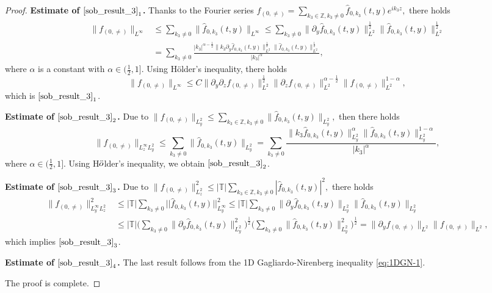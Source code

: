 \documentclass[12pt, reqno]{amsart}
\numberwithin{equation}{section}
\begin{document}
	\begin{proof}
		
		{\bf Estimate of $\eqref{sob_result_3}_1$.}
		Thanks to the Fourier series $f_{(0,\neq)}=\sum_{k_3\in \mathbb{Z},k_3\neq0}\widehat{f}_{0,k_3}(t,y)e^{ik_3z},$ there holds
		\begin{equation*}
			\begin{aligned}
				\|f_{(0,\neq)}\|_{L^{\infty}}&\leq \sum_{k_3\neq0}\|\widehat{f}_{0,k_3}(t,y)\|_{L^{\infty}}
				\leq \sum_{k_3\neq 0}
				\|\partial_y\widehat{f}_{0,k_3}(t,y)\|^{\frac{1}{2}}_{L^{2}}
				\|\widehat{f}_{0,k_3}(t,y)\|^{\frac{1}{2}}_{L^{2}}	\\
				&=\sum_{k_3\neq0}
				\frac{|k_3|^{\alpha-\frac12}\|k_3\partial_y\widehat{f}_{0,k_3}(t,y)\|^{\frac{1}{2}}_{L^{2}}
					\|\widehat{f}_{0,k_3}(t,y)\|^{\frac{1}{2}}_{L^{2}}}{|k_3|^{\alpha}},
			\end{aligned}
		\end{equation*}
		where $\alpha$ is a constant with $\alpha\in(\frac{1}{2},1].$
		Using H\"{o}lder's inequality, there holds
		$$	\|f_{(0,\neq)}\|_{L^{\infty}}\leq C\|\partial_y\partial_zf_{(0,\neq)}\|^{\frac{1}{2}}_{L^2}
		\|\partial_zf_{(0,\neq)}\|^{\alpha-\frac{1}{2}}_{L^2}
		\|f_{(0,\neq)}\|^{1-\alpha}_{L^2},$$ 
		which is $\eqref{sob_result_3}_1$.
		
		{\bf Estimate of $\eqref{sob_result_3}_2$.}
		Due to $\|f_{(0,\neq)}\|_{L^2_y}\leq \sum_{k_3\in \mathbb{Z},k_3\neq0}\|\widehat{f}_{0,k_3}(t,y)\|_{L^2_y},$
		then there holds $$\|f_{(0,\neq)}\|_{L^{\infty}_{z}L^2_y}
		\leq \sum_{k_3\neq{0}}\|\widehat{f}_{0,k_3}(t,y)\|_{L^2_y}
		=\sum_{k_3\neq{0}}
		\frac{\|k_3\widehat{f}_{0,k_3}(t,y)\|^{\alpha}_{L^2_y}\|\widehat{f}_{0,k_3}(t,y)\|^{1-\alpha}_{L^2_y}}{|k_3|^{\alpha}},$$
		where $\alpha\in(\frac{1}{2},1].$
		Using H$\rm \ddot{o}$lder's inequality, we obtain $\eqref{sob_result_3}_2$.
		
		{\bf Estimate of $\eqref{sob_result_3}_3$.}
		Due to $\|f_{(0,\neq)}\|_{L^{2}_{z}}^2
		\leq |\mathbb{T}|\sum_{k_3\in \mathbb{Z},k_3\neq0}|\widehat{f}_{0,k_3}(t,y)|^2,$ there holds
		\begin{align*}
			\|f_{(0,\neq)}\|_{L^{\infty}_yL^{2}_{z}}^2
			&\leq |\mathbb{T}|\sum_{k_3\neq0}||\widehat{f}_{0,k_3}(t,y)||^2_{L^{\infty}_y}
			\leq |\mathbb{T}|\sum_{k_3\neq0}
			\|\partial_y\widehat{f}_{0,k_3}(t,y)\|_{L^2_y}
			\|\widehat{f}_{0,k_3}(t,y)\|_{L^2_y}\\
			&\leq |\mathbb{T}|\Big(\sum_{k_3\neq0}
			\|\partial_y\widehat{f}_{0,k_3}(t,y)\|_{L^2_y}^2\Big)^{\frac{1}{2}}
			\Big(\sum_{k_3\neq0}
			\|\widehat{f}_{0,k_3}(t,y)\|_{L^2_y}^2\Big)^{\frac{1}{2}}
			=\|\partial_yf_{(0,\neq)}\|_{L^2}\|f_{(0,\neq)}\|_{L^2},
		\end{align*}
		which implies $\eqref{sob_result_3}_3$. 
		
		{\bf Estimate of $\eqref{sob_result_3}_4$.} The last result follows from the 1D Gagliardo-Nirenberg inequality \eqref{eq:1DGN-1}.
		
		The proof is complete.\end{proof}
	
\end{document}
